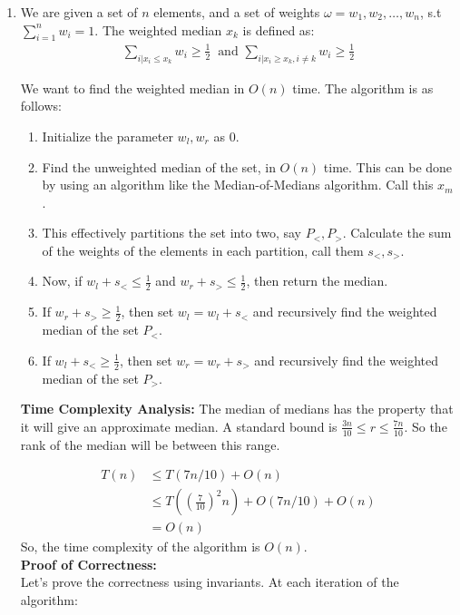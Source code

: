 \documentclass[a4paper]{article}
\begin{document}
\begin{enumerate}
    \newpage

    \item We are given a set of $n$ elements, and a set of weights $\omega = w_1, w_2, \dots, w_n$, s.t $\sum_{i=1}^{n} w_i = 1$. The weighted median $x_k$ is defined as:
    \begin{align*}
        \sum_{i|x_i \leq x_k} w_i \geq \frac{1}{2} \ \text{ and } \sum_{i|x_i \geq x_k, i \neq k} w_i \geq \frac{1}{2}
    \end{align*}

    We want to find the weighted median in $O(n)$ time. The algorithm is as follows:

    \begin{enumerate}[label=\arabic*.]
        \item Initialize the parameter $w_l, w_r$ as $0$.
        \item Find the unweighted median of the set, in $O(n)$ time. This can be done by using an algorithm like the Median-of-Medians algorithm. Call this $x_m$.
        \item This effectively partitions the set into two, say $P_{<}, P_{>}$. Calculate the sum of the weights of the elements in each partition, call them $s_{<}, s_{>}$.
        \item Now, if $w_l + s_{<} \leq \frac{1}{2}$ and $w_r + s_{>} \leq \frac{1}{2}$, then return the median.
        \item If $w_r + s_{>} \geq \frac{1}{2}$, then set $w_l = w_l + s_{<}$ and recursively find the weighted median of the set $P_{<}$.
        \item If $w_l + s_{<} \geq \frac{1}{2}$, then set $w_r = w_r + s_{>}$ and recursively find the weighted median of the set $P_{>}$.
    \end{enumerate}

    \textbf{Time Complexity Analysis:}
    The median of medians has the property that it will give an approximate median. A standard bound is $\frac{3n}{10} \leq r \leq \frac{7n}{10}$. So the rank of the median will be between this range.

    \begin{align*}
        T(n) &\leq T(7n/10) + O(n)\\
        &\leq T((\frac{7}{10})^2 n) + O(7n/10) + O(n)\\
        &= O(n)
    \end{align*}
    So, the time complexity of the algorithm is $O(n)$.\\

    \textbf{Proof of Correctness:}\\
    Let's prove the correctness using invariants. At each iteration of the algorithm:\\


\end{enumerate}
\end{document}
